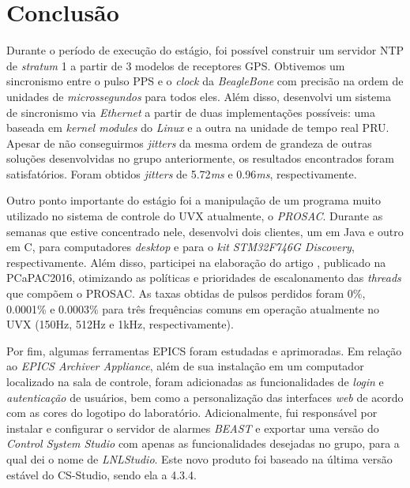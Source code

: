 \section{Conclusão}

Durante o período de execução do estágio, foi possível construir um servidor
NTP de \textit{stratum} 1 a partir de 3 modelos de receptores GPS. Obtivemos um
sincronismo entre o pulso PPS e o \textit{clock} da \textit{BeagleBone} com
precisão na ordem de unidades de \textit{microssegundos} para todos eles. Além
disso, desenvolvi um sistema de sincronismo via \textit{Ethernet} a partir
de duas implementações possíveis: uma baseada em \textit{kernel modules} do
\textit{Linux} e a outra na unidade de tempo real PRU. Apesar de não
conseguirmos \textit{jitters} da mesma ordem de grandeza de outras soluções
desenvolvidas no grupo anteriormente, os resultados encontrados foram
satisfatórios. Foram obtidos \textit{jitters} de 5.72\textit{ms} e
0.96\textit{ms}, respectivamente.

\vspace{12pt}

Outro ponto importante do estágio foi a manipulação de um programa muito
utilizado no sistema de controle do UVX atualmente, o \textit{PROSAC}. Durante
as semanas que estive concentrado nele, desenvolvi dois clientes, um em Java e
outro em C, para computadores \textit{desktop} e para o \textit{kit}
\textit{STM32F746G Discovery}, respectivamente. Além disso, participei na
elaboração do artigo \cite{pcapac2016}, publicado na PCaPAC2016, otimizando as
políticas e prioridades de escalonamento das \textit{threads} que compõem o
PROSAC. As taxas obtidas de pulsos perdidos foram 0\%, 0.0001\% e 0.0003\% para
três frequências comuns em operação atualmente no UVX (150Hz, 512Hz e 1kHz,
respectivamente).

\vspace{12pt}

Por fim, algumas ferramentas EPICS foram estudadas e aprimoradas. Em relação ao
\textit{EPICS Archiver Appliance}, além de sua instalação em um computador
localizado na sala de controle, foram adicionadas as funcionalidades de
\textit{login} e \textit{autenticação} de usuários, bem como a personalização
das interfaces \textit{web} de acordo com as cores do logotipo do laboratório.
Adicionalmente, fui responsável por instalar e configurar o servidor de alarmes
\textit{BEAST} e exportar uma versão do \textit{Control System Studio} com
apenas as funcionalidades desejadas no grupo, para a qual dei o nome de
\textit{LNLStudio}. Este novo produto foi baseado na última versão estável do
CS-Studio, sendo ela a 4.3.4.

